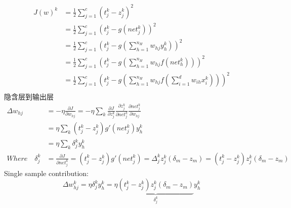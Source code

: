 \documentclass[a4paper,11pt,onecolumn,oneside,UTF8]{article}
\begin{document}
\begin{enumerate}
$$\begin{aligned}
                  J\left(w\right)^k    & =\frac{1}{2}\sum\limits_{j=1}^c\left(t_j^k-z_j^k\right)^2                                                                                                        \\
                                       & =\frac{1}{2}\sum\limits_{j=1}^c\left(t_j^k-g\left(net_j^k\right)\right)^2                                                                                        \\
                                       & =\frac{1}{2}\sum\limits_{j=1}^c\left(t_j^k-g\left(\sum\limits_{h=1}^{n_H}w_{hj}y_h^k\right)\right)^2                                                             \\
                                       & =\frac{1}{2}\sum\limits_{j=1}^c\left(t_j^k-g\left(\sum\limits_{h=1}^{n_H}w_{hj}f\left(net_h^k\right)\right)\right)^2                                             \\
                                       & =\frac{1}{2}\sum\limits_{j=1}^c\left(t_j^k-g\left(\sum\limits_{h=1}^{n_H}w_{hj}f\left(\sum\limits_{i=1}^{d}w_{ih}x_i^k\right)\right)\right)^2                    \\
              \end{aligned}
          $$
          隐含层到输出层
          $$
              \begin{aligned}
                  \Delta w_{hj}         & =-\eta\frac{\partial J}{\partial w_{hj}}=-\eta\sum\limits_{k}\frac{\partial J}{\partial z_{j}^k}\frac{\partial z_{j}^k}{\partial net_{j}^k}\frac{\partial net_{j}^k}{\partial w_{hj}} \\
                                        & =\eta\sum\limits_{k}\left(t_j^k-z_j^k\right)g'\left(net_j^k\right)y_h^k                                                                                                               \\
                                        & =\eta\sum\limits_{k}\delta_j^ky_h^k                                                                                                                                                   \\
                  Where\quad \delta_j^k & =\frac{\partial J}{\partial net_{j}^k}=\left(t_j^k-z_j^k\right)g'\left(net_j^k\right)=\Delta_j^kz_j^k\left(\delta_m-z_m\right)=\left(t_j^k-z_j^k\right)z_j^k\left(\delta_m-z_m\right)
              \end{aligned}
          $$
          Single sample contribution:
          $$
              \Delta w_{hj}^k =\eta\delta_j^ky_h^k=\eta\underbrace{\left(t_j^k-z_j^k\right)z_j^k\left(\delta_m-z_m\right)}_{\delta_j^k}y_h^k
$$
\end{enumerate}
\end{document}
